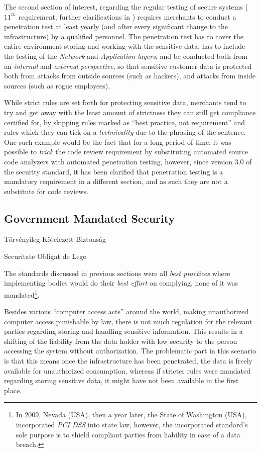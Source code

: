 \documentclass[a4paper,12pt]{article}
\newcommand\subsectionhu[1]{\addcontentsline{toc.hu}{subsection} {\protect\numberline{\thesubsection} #1}}
\newcommand\subsectionro[1]{\addcontentsline{toc.ro}{subsection} {\protect\numberline{\thesubsection} #1}}
\begin{document}
	The second section of interest, regarding the regular testing of secure systems ($11^{th}$ requirement, further clarifications in \cite{pcireq11}) requires merchants to conduct a penetration test at least yearly (and after every significant change to the infrastructure) by a qualified personnel. The penetration test has to cover the entire environment storing and working with the sensitive data, has to include the testing of the \textit{Network} and \textit{Application layers}, and be conducted both from an \textit{internal} and \textit{external perspective}, so that sensitive customer data is protected both from attacks from outside sources (such as hackers), and attacks from inside sources (such as rogue employees).
	
	While strict rules are set forth for protecting sensitive data, merchants tend to try and get away with the least amount of strictness they can still get compliance certified for, by skipping rules marked as ``best practice, not requirement'' and rules which they can tick on a \textit{technicality} due to the phrasing of the sentence. One such example would be the fact that for a long period of time, it was possible to \textit{trick} the code review requirement by substituting automated source code analyzers with automated penetration testing, however, since version 3.0 of the security standard, it has been clarified that penetration testing is a mandatory requirement in a different section, and as such they are not a substitute for code reviews.
	
\subsection{Government Mandated Security} \label{ssec:govmansec}
\subsectionhu{Törvényileg Kötelezett Biztonság} \subsectionro{Securitate Obligat de Lege}
	
	The standards discussed in previous sections were all \textit{best practices} where implementing bodies would do their \textit{best effort} on complying, none of it was mandated\footnote{In 2009, Nevada (USA), then a year later, the State of Washington (USA), incorporated \textit{PCI DSS} into state law\cite{wash10}, however, the incorporated standard's sole purpose is to shield compliant parties from liability in case of a data breach.}.
	
	Besides various ``computer access acts'' around the world, making unauthorized computer access punishable by law, there is not much regulation for the relevant parties regarding storing and handling sensitive information. This results in a shifting  of the liability from the data holder with low security to the person accessing the system without authorization. The problematic part in this scenario is that this means once the infrastructure has been penetrated, the data is freely available for unauthorized consumption, whereas if stricter rules were mandated regarding storing sensitive data, it might have not been available in the first place.
	
\end{document}

